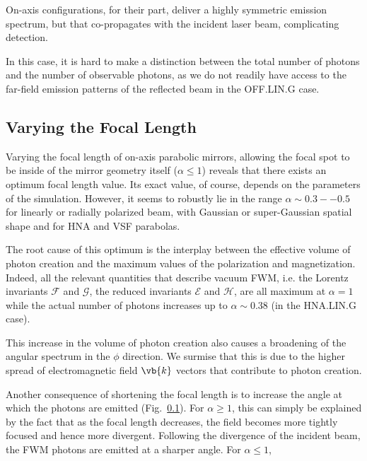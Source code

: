 \documentclass[11pt,SymmetricalJury]{inrsthesis/inrsthesis}
\begin{document}
On-axis configurations, for their part, deliver a highly symmetric emission
spectrum, but that co-propagates with the incident laser beam, complicating
detection. 

In this case, it is hard to make a distinction between the total number of photons
and the number of observable photons, as we do not readily have access to the
far-field emission patterns of the reflected beam in the OFF.LIN.G case.


\subsection{Varying the Focal Length}

Varying the focal length of on-axis parabolic mirrors, allowing the focal
spot to be inside of the mirror geometry itself ($\alpha\leq1$) reveals that
there exists an optimum focal length value. Its exact value, of course, depends
on the parameters of the simulation. However, it seems to robustly lie in the
range $\alpha\sim0.3--0.5$ for linearly or radially polarized beam, with Gaussian
or super-Gaussian spatial shape and for HNA and VSF parabolas.

The root cause of this optimum is the interplay between the effective volume
of photon creation and the maximum values of the polarization and magnetization.
Indeed, all the relevant quantities that describe vacuum FWM, i.e. the Lorentz
invariants $\mathcal{F}$ and $\mathcal{G}$, the reduced invariants $\mathcal{E}$
and $\mathcal{H}$, are all maximum at $\alpha=1$ while the actual number of
photons increases up to $\alpha\sim0.38$ (in the HNA.LIN.G case).

This increase in the volume of photon creation also causes a broadening of
the angular spectrum in the $\phi$ direction. We surmise that this is due
to the higher spread of electromagnetic field $\vb{k}$ vectors that contribute
to photon creation.

Another consequence of shortening the focal length is to increase the angle
at which the photons are emitted (Fig.~\ref{}). For $\alpha\geq1$, this can simply
be explained by the fact that as the focal length decreases, the field becomes
more tightly focused and hence more divergent. Following the divergence of the
incident beam, the FWM photons are emitted at a sharper angle. For $\alpha\leq1$,
\end{document}
